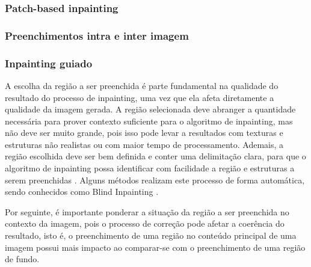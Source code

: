 \subsubsection{Patch-based inpainting} \label{quality-patch}



\subsubsection{Preenchimentos intra e inter imagem} \label{quality-intra-inter}


\subsubsection{Inpainting guiado} \label{quality-guided}
A escolha da região a ser preenchida é parte fundamental na qualidade do resultado do processo de inpainting, uma vez que ela afeta diretamente a qualidade da imagem gerada. A região selecionada deve abranger a quantidade necessária para prover contexto suficiente para o algoritmo de inpainting, mas não deve ser muito grande, pois isso pode levar a resultados com texturas e estruturas não realistas ou com maior tempo de processamento. Ademais, a região escolhida deve ser bem definida e conter uma delimitação clara, para que o algoritmo de inpainting possa identificar com facilidade a região e estruturas a serem preenchidas \cite{huang2014image}. Alguns métodos realizam este processo de forma automática, sendo conhecidos como Blind Inpainting \cite{wang2020vcnet}.

Por seguinte, é importante ponderar a situação da região a ser preenchida no contexto da imagem, pois o processo de correção pode afetar a coerência do resultado, isto é, o preenchimento de uma região no conteúdo principal de uma imagem possui mais impacto ao comparar-se com o preenchimento de uma região de fundo.

